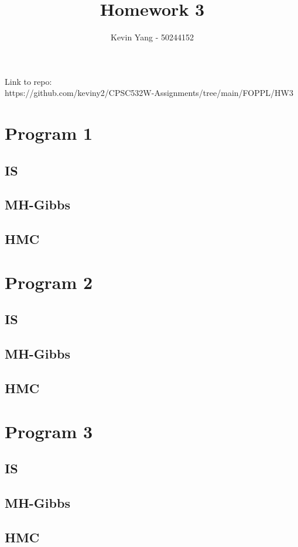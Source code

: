 \documentclass[10pt]{homeworg}
\title{Homework 3}
\author{Kevin Yang - 50244152}
\begin{document}
\maketitle

\Huge{Link to repo:}\\
\Large{https://github.com/keviny2/CPSC532W-Assignments/tree/main/FOPPL/HW3}


\section{Program 1}
\subsection{IS}
\subsection{MH-Gibbs}
\subsection{HMC}

\section{Program 2}
\subsection{IS}
\subsection{MH-Gibbs}
\subsection{HMC}

\section{Program 3}
\subsection{IS}
\subsection{MH-Gibbs}
\subsection{HMC}
\end{document}
